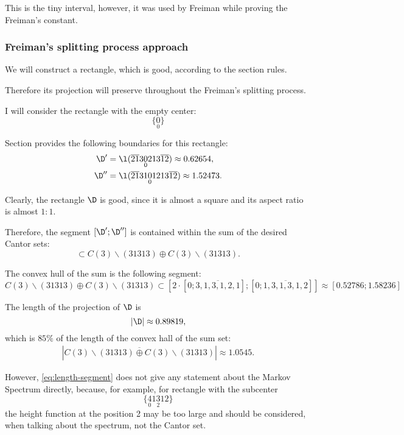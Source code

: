 This is the tiny interval, however, it was used by Freiman
while proving the Freiman's constant.


\subsubsection{Freiman's splitting process approach}

We will construct a rectangle,
which is good, according to the section  rules.

Therefore its projection will preserve throughout the Freiman's splitting process.

I will consider the rectangle with the empty center:
\begin{equation*}
	\{\underset{0}{0}\}
\end{equation*}

Section  provides the following boundaries for this rectangle:
\begin{align*}
	\D' & = \l(\overline{21}3\underset{0}{0}213\overline{12}) \approx 0.62654,\\
	\D'' & = \l(\overline{21}31\underset{0}{0}1213\overline{12}) \approx 1.52473.
\end{align*}

Clearly, the rectangle $\D$ is good, since it is almost a square and its aspect ratio is almost $1:1$.

Therefore, the segment $[\D'; \D'']$ is contained within the sum of the desired Cantor sets:
\begin{equation}
	[\D'; \D''] \subset C(3) \backslash (31313) \oplus C(3) \backslash (31313).
\end{equation}

The convex hull of the sum is the following segment:
\begin{equation*}
	C(3) \backslash (31313) \oplus C(3) \backslash (31313) \subset
	\left[ 2 \cdot \left[0; \overline{3, 1, 3, 1, 2, 1}\right]; \left[0; \overline{1, 3, 1, 3, 1, 2}\right] \right] \approx
	\left[0.52786; 1.58236\right]
\end{equation*}

The length of the projection of $\D$ is
\begin{equation}
	\label{eq:length-segment}
	\left|\D\right| \approx 0.89819,
\end{equation}
which is $85\%$ of the length of the convex hall of the sum set:
\begin{gather*}
	\left|\overline{C(3) \backslash (31313) \oplus C(3) \backslash (31313)}\right| \approx 1.0545.
\end{gather*}

However, \ref{eq:length-segment} does not give any statement about the Markov Spectrum directly,
because, for example, for rectangle with the subcenter
\begin{equation*}
	\{\underset{0}{4}1\underset{2}{3}12\}
\end{equation*}
the height function at the position 2 may be too large and should be considered,
when talking about the spectrum, not the Cantor set.
